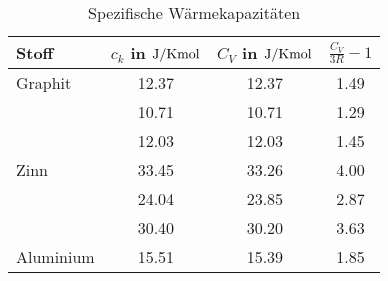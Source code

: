\begin{table}
 \centering
 \begin{tabular}{lS S S }
 \toprule
 {Stoff} & {{$c_k$ in $\si{\joule \per {\kelvin \mol}}$}} & {{$C_V$ in $\si{\joule \per {\kelvin \mol}}$}}  &  {$\frac{C_V}{3R} - 1$}  \\
\midrule
 {Graphit} &  12.37 & 12.37  & 1.49   \\
    &  10.71 & 10.71  & 1.29   \\
    &  12.03 & 12.03  & 1.45   \\
    \hline
{Zinn} & 33.45  & 33.26  & 4.00  \\
  & 24.04  & 23.85  & 2.87  \\
  & 30.40  & 30.20  & 3.63  \\
  \hline
{Aluminium} & 15.51  & 15.39  & 1.85   \\
\bottomrule
 \end{tabular}
 \caption{Spezifische Wärmekapazitäten}
 \label{tab: c_v}
  \end{table}
